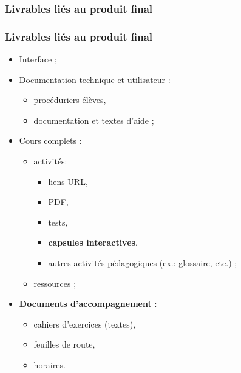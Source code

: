 					\subsubsection{Livrables liés au produit final} 
							\begin{frame}[allowframebreaks]
							\frametitle{Livrables liés au produit final}
                        			
							\begin{itemize}
							\item Interface ;
							\item Documentation technique et utilisateur :
								\begin{itemize}
								\item procéduriers élèves,
								\item documentation et textes d’aide ;
								\end{itemize}
							\item Cours complets :
								\begin{itemize}
								\item activités:
									\begin{itemize}
									\item liens URL,
									\item PDF,
									\item tests,
									\item \textbf{capsules interactives},
									\item autres activités pédagogiques (ex.: glossaire, etc.) ;
									\end{itemize}
								\framebreak
								\item ressources ;
									
								\end{itemize}
							\item \textbf{Documents d'accompagnement} :
								\begin{itemize}
								\item cahiers d’exercices (textes),
								\item feuilles de route,
								\item horaires.
								\end{itemize}
							\end{itemize}						
					\end{frame}
					
